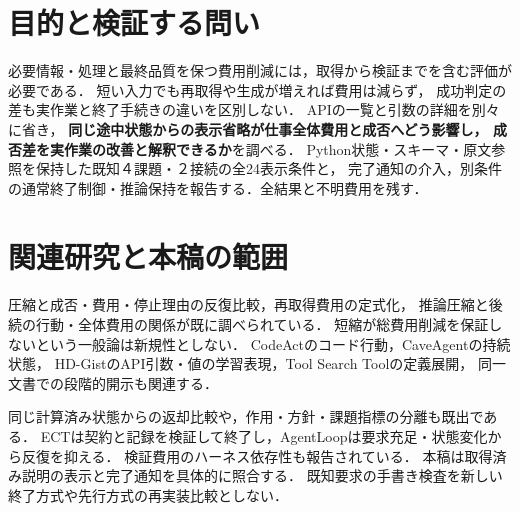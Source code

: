 \documentclass[letter]{ieicej}
\begin{document}
\maketitle
\begin{abstract}

\end{abstract}
\begin{keyword}\LetterJapaneseKeywords\end{keyword}
\begin{eabstract}

\end{eabstract}
\begin{ekeyword}\LetterEnglishKeywords\end{ekeyword}
\section{目的と検証する問い}
必要情報・処理と最終品質を保つ費用削減には，取得から検証までを含む評価が必要である．
短い入力でも再取得や生成が増えれば費用は減らず\cite{beyond,interaction}，
成功判定の差も実作業と終了手続きの違いを区別しない．
APIの一覧と引数の詳細を別々に省き，
\textbf{同じ途中状態からの表示省略が仕事全体費用と成否へどう影響し，
成否差を実作業の改善と解釈できるか}を調べる．
Python状態・スキーマ・原文参照を保持した既知４課題・２接続の全24表示条件と，
完了通知の介入，別条件の通常終了制御・推論保持を報告する．全結果と不明費用を残す．

\section{関連研究と本稿の範囲}
圧縮と成否・費用・停止理由の反復比較\cite{beyond}，再取得費用の定式化\cite{interaction}，
推論圧縮と後続の行動・全体費用の関係\cite{thinking}が既に調べられている．
短縮が総費用削減を保証しないという一般論は新規性としない．
CodeAct\cite{codeact}のコード行動，CaveAgent\cite{cave}の持続状態，
HD-Gist\cite{hdgist}のAPI引数・値の学習表現，Tool Search Tool\cite{toolsearch}の定義展開，
同一文書での段階的開示\cite{disclosure}も関連する．

同じ計算済み状態からの返却比較\cite{evidence}や，作用・方針・課題指標の分離\cite{matoi}も既出である．
ECT\cite{ect}は契約と記録を検証して終了し，AgentLoop\cite{agentloop}は要求充足・状態変化から反復を抑える．
検証費用のハーネス依存性も報告されている\cite{waste}．
本稿は取得済み説明の表示と完了通知を具体的に照合する．
既知要求の手書き検査を新しい終了方式や先行方式の再実装比較としない．
\end{document}
